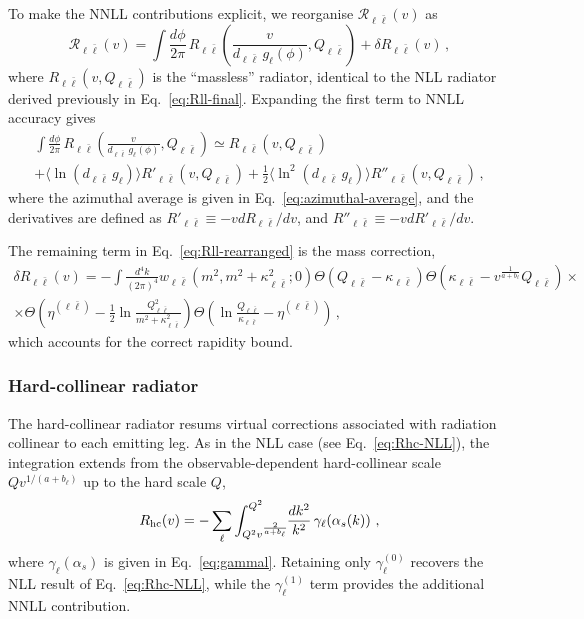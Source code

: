 To make the NNLL contributions explicit, we reorganise
$\mathcal{R}_{\ell\bar\ell}(v)$ as
\begin{equation}
\label{eq:Rll-rearranged}
  \mathcal{R}_{\ell\bar\ell}(v) = \int\frac{d\phi}{2\pi}\, R_{\ell\bar \ell}\left(\frac{v}{d_{\ell\bar \ell} \,g_\ell(\phi)},Q_{\ell\bar \ell}\right)+\delta R_{\ell\bar \ell}(v)\,,
\end{equation}
where $R_{\ell\bar\ell}(v,Q_{\ell\bar\ell})$ is the ``massless'' radiator, 
identical to the NLL radiator derived previously in
Eq.~\eqref{eq:Rll-final}. Expanding the first term to NNLL accuracy gives 
\begin{multline}
  \label{eq:Rll-expanded}
\int\frac{d\phi}{2\pi}\, R_{\ell\bar \ell}\left(\frac{v}{d_{\ell\bar \ell} \,g_\ell(\phi)},Q_{\ell\bar \ell}\right)\simeq  
R_{\ell\bar \ell}\left(v,Q_{\ell\bar \ell}\right)\\+\langle \ln(d_{\ell\bar \ell}\,g_\ell)\rangle R'_{\ell\bar \ell}\left(v,Q_{\ell\bar \ell}\right)+\frac 12
\langle \ln^2(d_{\ell\bar \ell}\,g_\ell)\rangle R''_{\ell\bar \ell}\left(v,Q_{\ell\bar \ell}\right)\,,
\end{multline}
where the azimuthal average is given in
Eq.~\eqref{eq:azimuthal-average}, and the derivatives are
defined as
$R'_{\ell\bar\ell}\equiv-vdR_{\ell\bar\ell}/dv$, and
$R''_{\ell\bar\ell}\equiv-vdR'_{\ell\bar\ell}/dv$.

The remaining term in Eq.~\eqref{eq:Rll-rearranged} is the mass
correction,
\begin{multline}
  \label{eq:dRll}
  \delta R_{\ell\bar\ell}(v) = -\int\frac{d^4
    k}{(2\pi)^4}w_{\ell\bar\ell}(m^2,m^2+\kappa_{\ell\bar\ell}^2;0)
 \Theta(Q_{\ell \bar\ell}-\kappa_{\ell\bar \ell}) \Theta(\kappa_{\ell\bar\ell}-v^{\frac1{a+b_\ell}} Q_{\ell\bar \ell}) \times \\
  \times \Theta\left(\eta^{(\ell\bar \ell)}-\frac 12\ln\frac{Q^2_{\ell\bar
        \ell}}{m^2+\kappa_{\ell\bar \ell}^2}
  \right)\Theta\left(\ln\frac{Q_{\ell\bar
        \ell}}{\kappa_{\ell\bar \ell}}-\eta^{(\ell\bar \ell)}  \right)\,,
\end{multline}
which accounts for the correct rapidity bound.

\subsubsection{Hard-collinear radiator}
The hard-collinear radiator resums virtual corrections associated with
radiation collinear to each emitting leg. As in the NLL case (see
Eq.~\eqref{eq:Rhc-NLL}), the integration extends from the
observable-dependent hard-collinear scale $Qv^{1/(a+b_\ell)}$ up to
the hard scale $Q$,
\begin{equation}
  \label{eq:Rhc-NNLL}
  R_{\rm hc}(v) =
  -\sum_\ell\int^{Q^2}_{Q^2v^{\frac{2}{a+b_\ell}}}
  \!\!\frac{dk^2}{k^2}\,\gamma_\ell\!\left(\alpha_s(k)\right)\,,
\end{equation}
where $\gamma_\ell(\alpha_s)$ is given in Eq.~\eqref{eq:gammal}.
Retaining only $\gamma_\ell^{(0)}$ recovers the NLL result of
Eq.~\eqref{eq:Rhc-NLL}, while the $\gamma_\ell^{(1)}$ term provides
the additional NNLL contribution.

